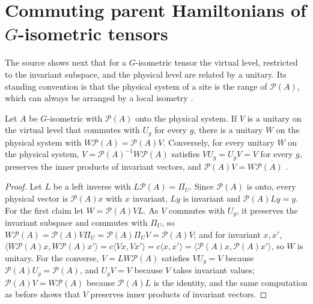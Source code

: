 \section{Commuting parent Hamiltonians of \texorpdfstring{$G$}{G}-isometric tensors}%
\label{sec:peps_g_isometric_commuting}

The source shows next that for a $G$-isometric tensor the virtual level,
restricted to the invariant subspace, and the physical level are related by a
unitary. Its standing convention is that the physical system of a site is the
range of $\mathcal{P}(A)$, which can always be arranged by a local isometry
\cite[Sections~``MPS and PEPS'' and ``Isometric PEPS'']{Schuch2010PEPS}.

\begin{lemma}%
    \label{thm:peps_g_isometric_virtual_unitaries}
    \leanok
    Let $A$ be $G$-isometric with $\mathcal{P}(A)$ onto the physical system.
    If $V$ is a unitary on the virtual level that commutes with $U_g$ for
    every $g$, there is a unitary $W$ on the physical system with
    $W\mathcal{P}(A)=\mathcal{P}(A)V$. Conversely, for every unitary $W$ on the
    physical system, $V=\mathcal{P}(A)^{-1}W\mathcal{P}(A)$ satisfies
    $VU_g=U_gV=V$ for every $g$, preserves the inner products of invariant
    vectors, and $\mathcal{P}(A)V=W\mathcal{P}(A)$
    \cite[Lemma~6.3]{Schuch2010PEPS}.
\end{lemma}

\begin{proof}\leanok
    Let $L$ be a left inverse with $L\mathcal{P}(A)=\Pi_U$. Since
    $\mathcal{P}(A)$ is onto, every physical vector is $\mathcal{P}(A)x$ with
    $x$ invariant, $Ly$ is invariant and $\mathcal{P}(A)Ly=y$. For the first
    claim let $W=\mathcal{P}(A)VL$. As $V$ commutes with $U_g$, it preserves
    the invariant subspace and commutes with $\Pi_U$, so
    $W\mathcal{P}(A)=\mathcal{P}(A)V\Pi_U=\mathcal{P}(A)\Pi_UV=\mathcal{P}(A)V$;
    and for invariant $x,x'$,
    $\langle W\mathcal{P}(A)x,W\mathcal{P}(A)x'\rangle
        =c\langle Vx,Vx'\rangle=c\langle x,x'\rangle
        =\langle\mathcal{P}(A)x,\mathcal{P}(A)x'\rangle$, so $W$ is unitary.
    For the converse, $V=LW\mathcal{P}(A)$ satisfies $VU_g=V$ because
    $\mathcal{P}(A)U_g=\mathcal{P}(A)$, and $U_gV=V$ because $V$ takes
    invariant values; $\mathcal{P}(A)V=W\mathcal{P}(A)$ because
    $\mathcal{P}(A)L$ is the identity, and the same computation as before
    shows that $V$ preserves inner products of invariant vectors.
\end{proof}

